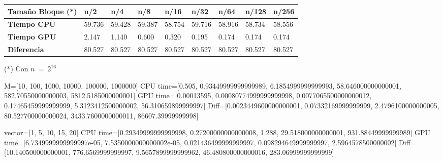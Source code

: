 \begin{center}
	\begin{tabular}{|l|l|l|l|l|l|l|l|l|}
		\hline
		\textbf{Tamaño Bloque} (*) & \textbf{n/2} & \textbf{n/4} & \textbf{n/8} & \textbf{n/16} & \textbf{n/32} & \textbf{n/64} & \textbf{n/128} & \textbf{n/256} \\\hline
		\textbf{Tiempo CPU} 							 & 59.736 & 59.428 & 59.387 & 58.754 & 59.716 & 58.916 & 58.734 & 58.556\\\hline 
		\textbf{Tiempo GPU} 							 &  2.147 &  1.140 &  0.600 &  0.320 &  0.195 &  0.174 &  0.174 &  0.174\\\hline 
		\textbf{Diferencia} 							 & 80.527 & 80.527 & 80.527 & 80.527 & 80.527 & 80.527 & 80.527 & 80.527\\\hline 
	\end{tabular}
	
	(*) Con $n\ =\ 2^{16}$
\end{center}

M=[10, 100, 1000, 10000, 100000, 1000000]
CPU time=[0.505, 0.93449999999999989, 6.1854999999999993, 58.646000000000001, 582.70550000000003, 5812.5185000000001]
GPU time=[0.00013595, 0.00080774999999999998, 0.0077065500000000012, 0.17465459999999999, 5.3123412500000002, 56.310659899999997]
Diff=[0.0023449600000000001, 0.07332169999999999, 2.4796100000000005, 80.527700000000024, 3433.7600000000011, 86607.39999999998]

vector=[1, 5, 10, 15, 20]
CPU time=[0.29349999999999998, 0.27200000000000008, 1.288, 29.518000000000001, 931.88449999999989]
GPU time=[6.7349999999999997e-05, 7.5350000000000002e-05, 0.021436499999999997, 0.098294649999999997, 2.5964578500000002]
Diff=[10.140500000000001, 776.6569999999997, 9.5657899999999962, 46.480800000000016, 283.06999999999999]

